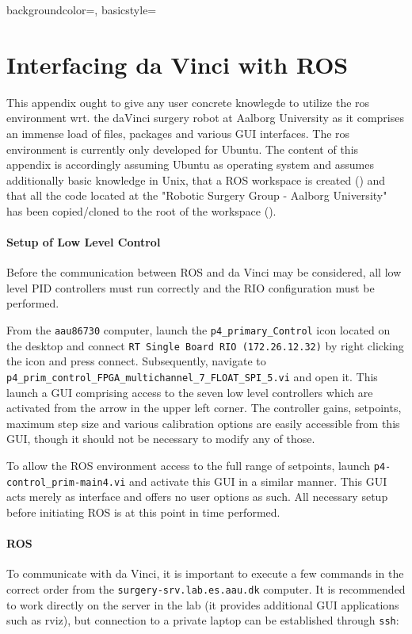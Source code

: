 {
    backgroundcolor=\color{black},
    basicstyle=\scriptsize\color{green}%
}
%
\chapter{Interfacing da Vinci with ROS}
This appendix ought to give any user concrete knowlegde to utilize the \gls{ros} environment wrt. the \gls{daVinci} surgery robot at Aalborg University as it comprises an immense load of files, packages and various GUI interfaces. The \gls{ros} environment is currently only developed for Ubuntu. The content of this appendix is accordingly assuming Ubuntu as operating system and assumes additionally basic knowledge in Unix, that a ROS workspace is created ({}) and that all the code located at the "Robotic Surgery Group - Aalborg University" has been copied/cloned to the root of the workspace ({}).
\subsubsection*{Setup of Low Level Control}
Before the communication between ROS and da Vinci may be considered, all low level PID controllers must run correctly and the RIO configuration must be performed. 

From the \texttt{aau86730} computer, launch the \texttt{p4\_primary\_Control} icon located on the desktop and connect \texttt{RT Single Board RIO (172.26.12.32)} by right clicking the icon and press connect. Subsequently, navigate to \texttt{p4\_prim\_control\_FPGA\_multichannel\_7\_FLOAT\_SPI\_5.vi} and open it. This launch a GUI comprising access to the seven low level controllers which are activated from the arrow in the upper left corner. The controller gains, setpoints, maximum step size and various calibration options are easily accessible from this GUI, though it should not be necessary to modify any of those. 

To allow the ROS environment access to the full range of setpoints, launch \texttt{p4-control\_prim-main4.vi} and activate this GUI in a similar manner. This GUI acts merely as interface and offers no user options as such. All necessary setup before initiating ROS is at this point in time performed.
\subsubsection*{ROS}
To communicate with da Vinci, it is important to execute a few commands in the correct order from the \texttt{surgery-srv.lab.es.aau.dk} computer. It is recommended to work directly on the server in the lab (it provides additional GUI applications such as rviz), but connection to a private laptop can be established through \texttt{ssh}:

